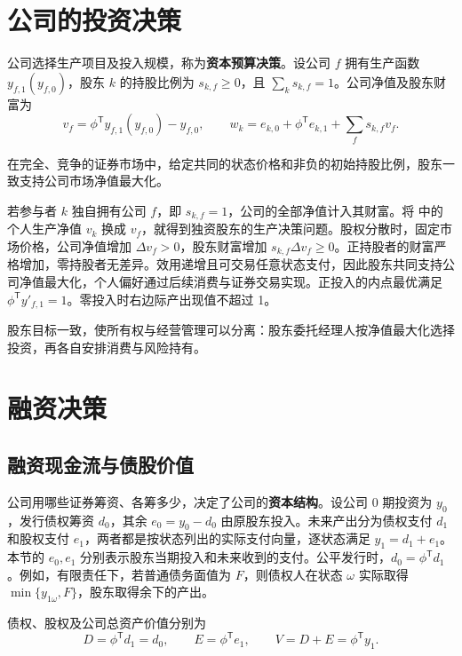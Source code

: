 \section{公司的投资决策}\label{sec:wj-fifteen-2}
公司选择生产项目及投入规模，称为\textbf{资本预算决策}。设公司 $f$ 拥有生产函数 $y_{f,1}(y_{f,0})$，股东 $k$ 的持股比例为 $s_{k,f}\ge0$，且 $\sum_ks_{k,f}=1$。公司净值及股东财富为
\[
 v_f=\phi^{\mathsf T}y_{f,1}(y_{f,0})-y_{f,0},\qquad
 w_k=e_{k,0}+\phi^{\mathsf T}e_{k,1}+\sum_fs_{k,f}v_f.
\]
\begin{tcolorbox}[knowledge]
 在完全、竞争的证券市场中，给定共同的状态价格和非负的初始持股比例，股东一致支持公司市场净值最大化。
\end{tcolorbox}

\begin{solution}[label-content={证明},blank-type=none]
若参与者 $k$ 独自拥有公司 $f$，即 $s_{k,f}=1$，公司的全部净值计入其财富。将 中的个人生产净值 $v_k$ 换成 $v_f$，就得到独资股东的生产决策问题。股权分散时，固定市场价格，公司净值增加 $\Delta v_f>0$，股东财富增加 $s_{k,f}\Delta v_f\ge0$。正持股者的财富严格增加，零持股者无差异。效用递增且可交易任意状态支付，因此股东共同支持公司净值最大化，个人偏好通过后续消费与证券交易实现。正投入的内点最优满足 $\phi^{\mathsf T}y'_{f,1}=1$。零投入时右边际产出现值不超过 1。
\end{solution}

股东目标一致，使所有权与经营管理可以分离：股东委托经理人按净值最大化选择投资，再各自安排消费与风险持有。

\section{融资决策}\label{sec:wj-fifteen-3}
\subsection{融资现金流与债股价值}
公司用哪些证券筹资、各筹多少，决定了公司的\textbf{资本结构}。设公司 0 期投资为 $y_0$，发行债权筹资 $d_0$，其余 $e_0=y_0-d_0$ 由原股东投入。未来产出分为债权支付 $d_1$ 和股权支付 $e_1$，两者都是按状态列出的实际支付向量，逐状态满足 $y_1=d_1+e_1$。本节的 $e_0,e_1$ 分别表示股东当期投入和未来收到的支付。公平发行时，$d_0=\phi^{\mathsf T}d_1$。例如，有限责任下，若普通债务面值为 $F$，则债权人在状态 $\omega$ 实际取得 $\min\{y_{1\omega},F\}$，股东取得余下的产出。

债权、股权及公司总资产价值分别为
\[
 D=\phi^{\mathsf T}d_1=d_0,\qquad E=\phi^{\mathsf T}e_1,\qquad
 V=D+E=\phi^{\mathsf T}y_1.
\]


